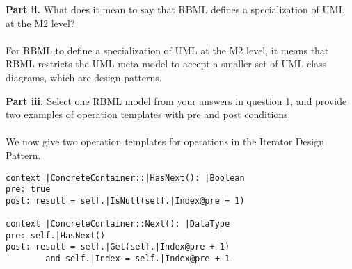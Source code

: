 \documentclass{article}
\begin{document}
\noindent
{\bf Part ii.} 
What does it mean to say that RBML defines a specialization of UML at the M2 level? \\\\
For RBML to define a specialization of UML at the M2 level, it means that RBML restricts the UML meta-model to accept a smaller set of UML class diagrams, which are design patterns.
\newline

\noindent
{\bf Part iii.} 
Select one RBML model from your answers in question 1, and provide two examples of
operation templates with pre and post conditions. \\\\
We now give two operation templates for operations in the Iterator Design Pattern.

\begin{Verbatim}
context |ConcreteContainer::|HasNext(): |Boolean
pre: true
post: result = self.|IsNull(self.|Index@pre + 1)
		
context |ConcreteContainer::Next(): |DataType
pre: self.|HasNext()
post: result = self.|Get(self.|Index@pre + 1)
		and self.|Index = self.|Index@pre + 1
\end{Verbatim}
\end{document}
